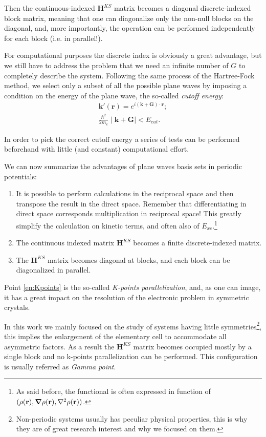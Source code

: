 \documentclass[a4paper,12pt]{article}
\newcommand\mf[1]{\mathbf{#1}}
\newcommand\dens{\rho(\mathbf{r})}
\newcommand\erre{\mathbf{r}}
\begin{document}
Then the continuous-indexed $\mf{H}^{KS}$ matrix becomes a diagonal discrete-indexed block matrix, meaning that one can diagonalize only the non-null blocks on the diagonal, and, more importantly, the operation can be performed independently for each block (i.e. in parallel!).

For computational purposes the discrete index is obviously a great advantage, but we still have to address the problem that we need an infinite number of $G$ to completely describe the system.
Following the same process of the Hartree-Fock method, we select only a subset of all the possible plane waves by imposing a condition on the energy of the plane wave, the so-called \textit{cutoff energy}:
\begin{align}
	\mf{k'}(\erre) = e^{i(\mf{k + G}) \cdot \erre};\\
	\frac{\hbar^2}{2m_e}\mid \mf{k + G} \mid < E_{cut}.
\end{align}

In order to pick the correct cutoff energy a series of tests can be performed beforehand with little (and constant) computational effort.

We can now summarize the advantages of plane waves basis sets in periodic potentials:
\begin{enumerate}
	\item It is possible to perform calculations in the reciprocal space and then transpose the result in the direct space. Remember that differentiating in direct space corresponds multiplication in reciprocal space! This greatly simplify the calculation on kinetic terms, and often also of $E_{xc}$.\footnote{As said before, the functional is often expressed in function of $(\dens,\grad\dens,\nabla^2\dens)$.}
	\item The continuous indexed matrix $\mf{H}^{KS}$ becomes a finite discrete-indexed matrix.
	\item The $\mf{H}^{KS}$ matrix becomes diagonal at blocks, and each block can be diagonalized in parallel. \label{en:Kpoints}
\end{enumerate}

Point \ref{en:Kpoints} is the so-called \textit{K-points parallelization}, and, as one can image, it has a great impact on the resolution of the electronic problem in symmetric crystals.

In this work we mainly focused on the study of systems having little symmetries\footnote{Non-periodic systems usually has peculiar physical properties, this is why they are of great research interest and why we focused on them.}, this implies the enlargement of the elementary cell to accommodate all asymmetric factors. 
As a result the $\mf{H}^{KS}$ matrix becomes occupied mostly by a single block and no k-points parallelization can be performed.
This configuration is usually referred as \textit{Gamma point}.
\end{document}
